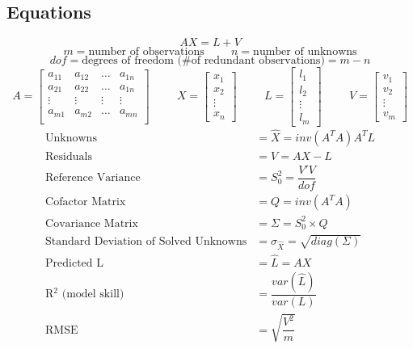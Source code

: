 \subsection{Equations}
\[
AX=L+V 
\]
\[
m = \text{number of observations} \hspace{1cm} 
n = \text{number of unknowns}
\]
\[
dof = \text{degrees of freedom (\# of redundant observations)} = m-n
\]
\[
A = \begin{bmatrix}
a_{11} & a_{12} & \dots & a_{1n} \\
a_{21} & a_{22} & \dots & a_{1n} \\
\vdots & \vdots & \vdots& \vdots \\
a_{m1} & a_{m2} & \dots & a_{mn} \\
\end{bmatrix}
\hspace{1cm}
X = 
\begin{bmatrix}
x_1 \\ x_2 \\ \vdots \\ x_n
\end{bmatrix}
\hspace{1cm}
L = 
\begin{bmatrix}
l_1 \\ l_2 \\ \vdots \\ l_m
\end{bmatrix}
\hspace{1cm}
V = 
\begin{bmatrix}
v_1 \\ v_2 \\ \vdots \\ v_m
\end{bmatrix}
\]
\begin{align*}
\text{Unknowns} &= \hat{X} = inv(A^TA)A^TL\\
\text{Residuals} &= V = AX - L\\
\text{Reference Variance} &= S_0^2 = \dfrac{V'V}{dof} \\
\text{Cofactor Matrix} &= Q = inv(A^TA) \\
\text{Covariance Matrix} &= \Sigma = S_0^2 \times Q \\
\text{Standard Deviation of Solved Unknowns} &= \sigma_{\hat{X}} = \sqrt{diag(\Sigma)} \\
\text{Predicted L} &= \hat{L} = AX \\
\text{R$^2$ (model skill)} &= \dfrac{var(\hat{L})}{var(L)} \\
\text{RMSE } &= \sqrt{\dfrac{V^2}{m}} \\
\end{align*}
\clearpage
